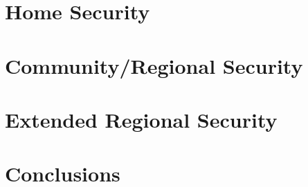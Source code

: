 \documentclass[sigconf]{acmart}
\begin{document}
\section{Home Security}

\section{Community/Regional Security}

\section{Extended Regional Security}

\section{Conclusions}

\begin{acks}

\end{acks}


 
\end{document}
